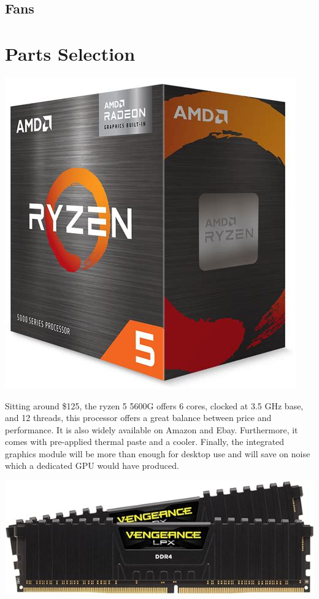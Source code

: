 \documentclass[12pt, a4paper]{article}
\begin{document}
\subsection{Fans}



\section{Parts Selection}

\begin{center}
  \includegraphics[scale=0.2]{ryzen.png}
\end{center}

Sitting around \$125, the ryzen 5 5600G offers 6 cores, clocked at 3.5 GHz
base, and 12 threads, this processor offers a great balance between price
and performance. It is also widely available on Amazon and Ebay. 
Furthermore, it comes with pre-applied thermal paste and a cooler. Finally,
the integrated graphics module will be more than enough for desktop use
and will save on noise which a dedicated GPU would have produced.

\vspace{4pt}
\begin{center}
  \includegraphics[scale=0.29]{el_ram_de_comer.jpg}
\end{center}
\end{document}
